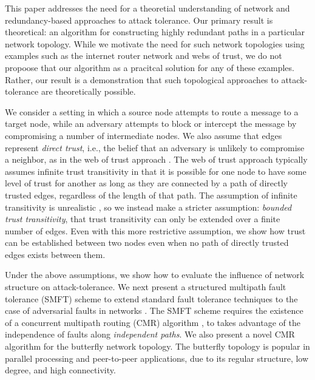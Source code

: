 \documentclass[10pt,letterpaper]{article}
\begin{document}
This paper addresses the need for a theoretial understanding of network and
redundancy-based approaches to attack tolerance.
Our primary result is theoretical: an algorithm for constructing highly redundant
paths in a particular network topology.
While we motivate the need for such network topologies using examples such as
the internet router network and webs of trust,
we do not propoose that our algorithm as a pracitcal solution for any of these
examples.
Rather, our result is a demonstration that such topological approaches to
attack-tolerance are theoretically possible.

We consider a setting in which a source node attempts to route a message
to a target node, while an adversary attempts to block or intercept the message
by compromising a number of intermediate nodes.
We also assume that edges represent {\em direct trust},
i.e., the belief that an adversary is unlikely to compromise a neighbor,
as in the web of trust approach
\cite{zimmermann_official_1995,richters_trust_2011}.
The web of trust approach typically assumes infinite trust transitivity in that
it is possible for one node to have some level of trust for another as long
as they are connected by a path of directly trusted edges,
regardless of the length of that path.
The assumption of infinite transitivity is unrealistic
\cite{christianson_why_1997},
so we instead make a stricter assumption: {\em bounded trust transitivity},
that trust transitivity can only be extended over a finite number of edges.
Even with this more restrictive assumption, we show how trust can be established
between two nodes even when no path of directly trusted edges exists between them.

Under the above assumptions,
we show how to evaluate the influence of network structure
on attack-tolerance.
We next present a structured multipath fault tolerance (SMFT) scheme to extend
standard fault tolerance techniques to the case of adversarial faults in
networks
\cite{avizienis_basic_2004, von_neumann_probabilistic_1956}.
The SMFT scheme requires the existence of a
concurrent multipath routing (CMR) algorithm
\cite{zin_survey_2015, qadir_exploiting_2015, khiani_comparative_2013},
to takes advantage of the independence of faults
along {\em independent paths}.
We also present a novel CMR algorithm for the butterfly network topology.
The butterfly topology is popular in parallel processing
\cite{kshemkalyani_distributed_2008} and
peer-to-peer \cite{lua_survey_2005, korzun_structured_2013}
applications, due to its regular structure, low degree, and high connectivity.
\end{document}

